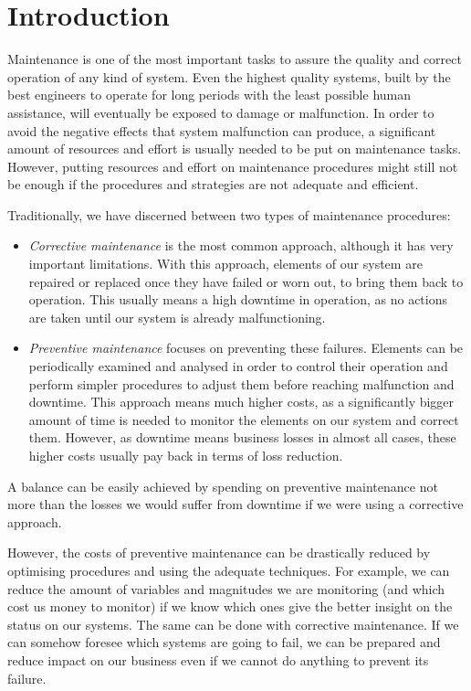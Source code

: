\documentclass[a4paper,12pt]{article}
\begin{document}
\setcounter{page}{1}
\section{Introduction}\label{sec:context}
Maintenance is one of the most important tasks to assure the quality and correct operation of any kind of system. Even the highest quality systems, built by the best engineers to operate for long periods with the least possible human assistance, will eventually be exposed to damage or malfunction. In order to avoid the negative effects that system malfunction can produce, a significant amount of resources and effort is usually needed to be put on maintenance tasks. However, putting resources and effort on maintenance procedures might still not be enough if the procedures and strategies are not adequate and efficient.

Traditionally, we have discerned between two types of maintenance procedures:
\begin{itemize}
\item \emph{Corrective maintenance} is the most common approach, although it has very important limitations. With this approach, elements of our system are repaired or replaced once they have failed or worn out, to bring them back to operation. This usually means a high downtime in operation, as no actions are taken until our system is already malfunctioning.

\item \emph{Preventive maintenance} focuses on preventing these failures. Elements can be periodically examined and analysed in order to control their operation and perform simpler procedures to adjust them before reaching malfunction and downtime. This approach means much higher costs, as a significantly bigger amount of time is needed to monitor the elements on our system and correct them. However, as downtime means business losses in almost all cases, these higher costs usually pay back in terms of loss reduction.
\end{itemize}

A balance can be easily achieved by spending on preventive maintenance not more than the losses we would suffer from downtime if we were using a corrective approach.

However, the costs of preventive maintenance can be drastically reduced by optimising procedures and using the adequate techniques. For example, we can reduce the amount of variables and magnitudes we are monitoring (and which cost us money to monitor) if we know which ones give the better insight on the status on our systems. The same can be done with corrective maintenance. If we can somehow foresee which systems are going to fail, we can be prepared and reduce impact on our business even if we cannot do anything to prevent its failure.
\end{document}
